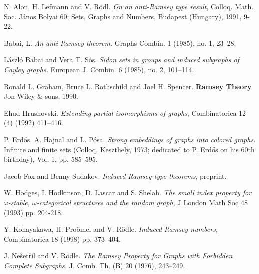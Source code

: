 \documentclass[11pt]{amsart}
\begin{document}
\begin{thebibliography}{99}

 N. Alon, H. Lefmann and V. R\"odl.
{\sl On an anti-Ramsey type result}, Colloq. Math. Soc.
J\'anos Bolyai 60; Sets, Graphs and Numbers, Budapest (Hungary),
1991, 9-22.


 Babai, L.
{\sl An anti-Ramsey theorem.}
Graphs Combin. 1 (1985), no. 1, 23--28.


 L\'aszl\'o Babai and  Vera T. S\'os.
{\sl Sidon sets in groups and induced subgraphs of Cayley graphs.}
European J. Combin. 6 (1985), no. 2, 101--114.



 Ronald L. Graham, Bruce L. Rothschild and Joel
  H. Spencer. {\bf Ramsey Theory} Jon Wiley \& sons, 1990. 

 Ehud Hrushovski. {\sl Extending partial isomorphisms of
  graphs}, Combinatorica  12 (4) (1992) 411--416.

 P. Erd\H os, A. Hajnal and L.  P\'osa. {\sl Strong
    embeddings of graphs into colored graphs.} Infinite and finite
  sets (Colloq. Keszthely, 1973; dedicated to P. Erd\H os on his 60th
  birthday), Vol. 1, pp. 585--595.

 Jacob Fox and Benny Sudakov. {\sl Induced Ramsey-type
    theorems}, preprint. 


 W. Hodges, I. Hodkinson, D. Lascar and S. Shelah. {\sl The
    small index property for $\omega $-stable, $\omega$-categorical
    structures and the random graph,} J London Math Soc 48 (1993)
    pp. 204-218.

 Y. Kohayakawa, H. Pro\"omel and V. R\"odle. {\sl Induced
    Ramsey numbers,} Combinatorica 18 (1998) pp. 373--404.

 J. Ne\v set\v ril and V. R\"odle. {\sl The Ramsey
    Property for Graphs with Forbidden Complete Subgraphs.}
  J. Comb. Th. (B) 20 (1976), 243--249.



\end{thebibliography}
\end{document}
